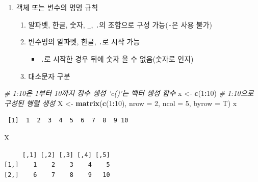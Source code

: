 \documentclass[11pt,a4paper]{book}
\newenvironment{Shaded}{\begin{snugshade}}{\end{snugshade}}
\newcommand{\KeywordTok}[1]{\textcolor[rgb]{0.13,0.29,0.53}{\textbf{#1}}}
\newcommand{\DataTypeTok}[1]{\textcolor[rgb]{0.13,0.29,0.53}{#1}}
\newcommand{\DecValTok}[1]{\textcolor[rgb]{0.00,0.00,0.81}{#1}}
\newcommand{\StringTok}[1]{\textcolor[rgb]{0.31,0.60,0.02}{#1}}
\newcommand{\CommentTok}[1]{\textcolor[rgb]{0.56,0.35,0.01}{\textit{#1}}}
\newcommand{\OperatorTok}[1]{\textcolor[rgb]{0.81,0.36,0.00}{\textbf{#1}}}
\newcommand{\NormalTok}[1]{#1}
\providecommand{\tightlist}{%
  \setlength{\itemsep}{0pt}\setlength{\parskip}{0pt}}
\theoremstyle{definition}
\theoremstyle{definition}
\theoremstyle{definition}
\theoremstyle{remark}
\begin{document}
\begin{enumerate}
\def\labelenumi{\arabic{enumi}.}
\setcounter{enumi}{1}
\tightlist
\item
  객체 또는 변수의 명명 규칙

  \begin{enumerate}
  \def\labelenumii{\arabic{enumii})}
  \tightlist
  \item
    알파벳, 한글, 숫자, \texttt{\_}, \texttt{.}의 조합으로 구성
    가능(\texttt{-}은 사용 불가)
  \item
    변수명의 알파벳, 한글, \texttt{.}로 시작 가능

    \begin{itemize}
    \tightlist
    \item
      \texttt{.}로 시작한 경우 뒤에 숫자 올 수 없음(숫자로 인지)
    \end{itemize}
  \item
    대소문자 구분 \footnotesize
  \end{enumerate}
\end{enumerate}

\begin{Shaded}
\begin{Highlighting}[]
\CommentTok{# 1:10은 1부터 10까지 정수 생성 'c()'는 벡터 생성 함수}
\NormalTok{x <-}\StringTok{ }\KeywordTok{c}\NormalTok{(}\DecValTok{1}\OperatorTok{:}\DecValTok{10}\NormalTok{)}
\CommentTok{# 1:10으로 구성된 행렬 생성}
\NormalTok{X <-}\StringTok{ }\KeywordTok{matrix}\NormalTok{(}\KeywordTok{c}\NormalTok{(}\DecValTok{1}\OperatorTok{:}\DecValTok{10}\NormalTok{), }\DataTypeTok{nrow =} \DecValTok{2}\NormalTok{, }\DataTypeTok{ncol =} \DecValTok{5}\NormalTok{, }\DataTypeTok{byrow =}\NormalTok{ T)}
\NormalTok{x}
\end{Highlighting}
\end{Shaded}

\begin{verbatim}
 [1]  1  2  3  4  5  6  7  8  9 10
\end{verbatim}

\begin{Shaded}
\begin{Highlighting}[]
\NormalTok{X}
\end{Highlighting}
\end{Shaded}

\begin{verbatim}
     [,1] [,2] [,3] [,4] [,5]
[1,]    1    2    3    4    5
[2,]    6    7    8    9   10
\end{verbatim}
\end{document}
